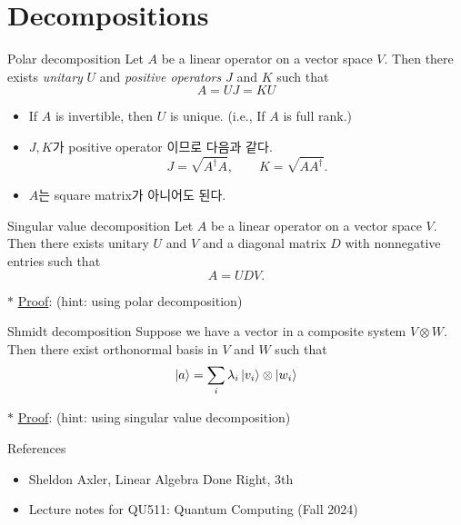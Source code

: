 \documentclass[9pt]{beamer}
\begin{document}
    \section{Decompositions}
    \begin{frame}{Polar decomposition}
        Let $A$ be a linear operator on a vector space $V$. Then there exists \textit{unitary} $U$ and \textit{positive operators} $J$ and $K$ such that
        $$A = UJ = KU$$
        
        \vspace{0.2cm}

        \begin{itemize}
        \item If $A$ is invertible, then $U$ is unique. (i.e., If $A$ is full rank.)
        \item $J, K$가 positive operator 이므로 다음과 같다.
        $$ J = \sqrt{A^\dagger A}, \qquad K = \sqrt{AA^\dagger}.$$
        \item $A$는 square matrix가 아니어도 된다.
        \end{itemize}
    \end{frame}

    \begin{frame}{Singular value decomposition}
        Let $A$ be a linear operator on a vector space $V$. Then there exists unitary $U$ and $V$ and a diagonal matrix $D$ with nonnegative entries such that
        $$A = UDV.$$    
        \vspace{0.2cm}

        $\ast$ \underline{Proof}: (hint: using polar decomposition)
        \vspace{3.5cm}
    \end{frame}

    \begin{frame}{Shmidt decomposition}
        Suppose we have a vector in a composite system $V \otimes W$. Then there exist orthonormal basis in $V$ and $W$ such that
        $$ \ket a = \sum_i \lambda_i \ket{v_i} \otimes \ket{w_i}$$
        \vspace{0.2cm}

        $\ast$ \underline{Proof}: (hint: using singular value  decomposition)
        \vspace{3.5cm}
    \end{frame}
    
    \begin{frame}{References}
        
        \begin{itemize}
            \item Sheldon Axler, Linear Algebra Done Right, 3th
            \item Lecture notes for QU511: Quantum Computing (Fall 2024)
        \end{itemize}
        \vspace{6cm}
    \end{frame}
    
\end{document}
